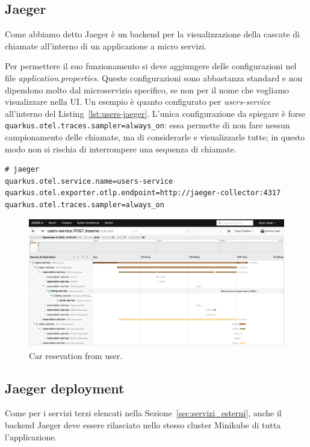 \subsection{Jaeger}
Come abbiamo detto Jaeger è un backend per la visualizzazione della cascate di chiamate all'interno di un applicazione a micro servizi.

Per permettere il suo funzionamento si deve aggiungere delle configurazioni nel file \textit{application.properties}. Queste configurazioni sono abbastanza standard e non dipendono molto dal microservizio specifico, se non per il nome che vogliamo visualizzare nella UI. Un esempio è quanto configurato per \textit{users-service} all'interno del Listing~\ref{lst:users-jaeger}. L'unica configurazione da spiegare è forse \texttt{quarkus.otel.traces.sampler=always\_on}: essa permette di non fare nessun campionamento delle chiamate, ma di considerarle e visualizzarle tutte; in questo modo non si rischia di interrompere una sequenza di chiamate.
\begin{lstlisting}[caption=Jaeger configuration for \textit{users-service}, label=lst:users-jaeger]
# jaeger
quarkus.otel.service.name=users-service
quarkus.otel.exporter.otlp.endpoint=http://jaeger-collector:4317
quarkus.otel.traces.sampler=always_on
\end{lstlisting}

\begin{figure}[htbp]
    \centering
    \includegraphics[width=.9\textwidth]{images/4-tracing_metrics/jaeger use case.pdf}
    \caption{Car resevation from user.}
    \label{fig:jaeger_reservation}
\end{figure}

\subsection{Jaeger deployment}
Come per i servizi terzi elencati nella Sezione~\ref{sec:servizi_esterni}, anche il backend Jaeger deve essere rilasciato nello stesso cluster Minikube di tutta l'applicazione.

